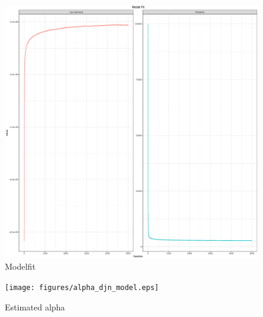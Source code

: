 \begin{figure}[H]
	\includegraphics[width=1\linewidth]{figures/modelfit_djn_model.eps}
	\caption{Modelfit}
	\label{fig:modelfit}
\end{figure}

 \begin{figure}[H]
	\begin{center}
		\texttt{[image: figures/alpha\_djn\_model.eps]}
		\caption{Estimated alpha}
		\label{fig:alpha}
	\end{center}
\end{figure}





